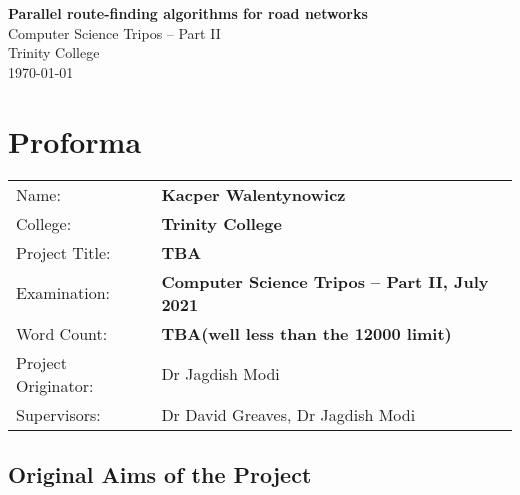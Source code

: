 \documentclass[12pt,a4paper,twoside,openright]{report}
\begin{document}
%




\pagestyle{empty}


\vspace*{60mm}
\begin{center}
\Huge
\textbf{Parallel route-finding algorithms for road networks} \\[5mm]
Computer Science Tripos -- Part II \\[5mm]
Trinity College \\[5mm]
\today  %
\end{center}


\pagestyle{plain}

\chapter*{Proforma}

{\large
\begin{tabular}{ll}
Name:               & \bf Kacper Walentynowicz                       \\
College:            & \bf Trinity College                     \\
Project Title:      & \bf TBA \\
Examination:        & \bf Computer Science Tripos -- Part II, July 2021  \\
Word Count:         & \bf TBA\footnotemark[1]
                      (well less than the 12000 limit)  \\
Project Originator: & Dr Jagdish Modi                    \\
Supervisors:         & Dr David Greaves, Dr Jagdish Modi                     \\ 
\end{tabular}
}


\section*{Original Aims of the Project}
\end{document}
